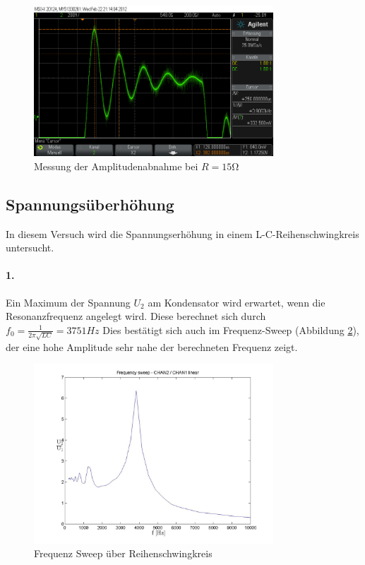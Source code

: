 \documentclass[a4paper]{article}
\begin{document}
\begin{figure}[H]
    \centering
    \includegraphics[width=0.8\textwidth]{versuch2_3_15ohm_amplitude.png}
    \caption{Messung der Amplitudenabnahme bei $R=15\si{\ohm}$}
    \label{fig:versuch2-3-15ohm-amplitude}
\end{figure}

\subsection{Spannungsüberhöhung}
In diesem Versuch wird die Spannungserhöhung in einem L-C-Reihenschwingkreis untersucht.
\paragraph{1.}
Ein Maximum der Spannung $U_2$ am Kondensator wird erwartet, wenn die Resonanzfrequenz angelegt wird.
Diese berechnet sich durch $f_0=\frac{1}{2\pi\sqrt{LC}}=3751\si{Hz}$
Dies bestätigt sich auch im Frequenz-Sweep (Abbildung \ref{fig:versuch3-sweep}), der eine hohe Amplitude sehr nahe der berechneten Frequenz zeigt.

\begin{figure}[H]
    \centering
    \includegraphics[width=0.8\textwidth]{versuch3_sweep_ylinxlin1.jpg}
    \caption{Frequenz Sweep über Reihenschwingkreis}
    \label{fig:versuch3-sweep}
\end{figure}
\end{document}
